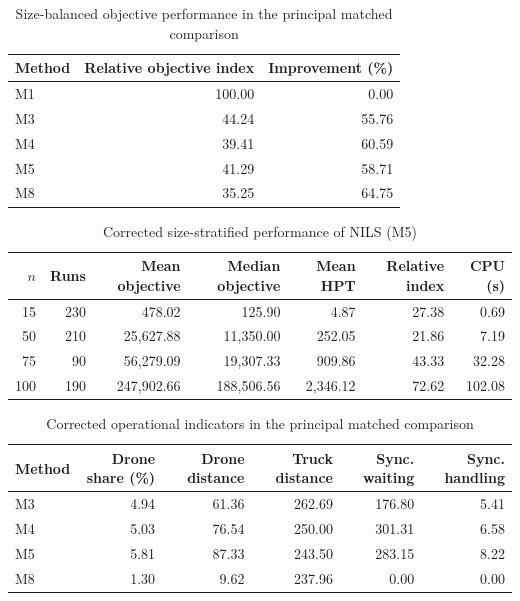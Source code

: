 
\begin{table}[htbp]
\centering
\caption{Size-balanced objective performance in the principal matched comparison}
\label{tab:size_balanced_corrected}
\small
\begin{tabular}{lrr}
\toprule
Method & Relative objective index & Improvement (\%) \\
\midrule
M1 & 100.00 & 0.00 \\
M3 & 44.24 & 55.76 \\
M4 & 39.41 & 60.59 \\
M5 & 41.29 & 58.71 \\
M8 & 35.25 & 64.75 \\
\bottomrule
\end{tabular}
\end{table}

\begin{table}[htbp]
\centering
\caption{Corrected size-stratified performance of NILS (M5)}
\label{tab:nils_size_corrected}
\small
\begin{tabular}{rrrrrrr}
\toprule
$n$ & Runs & Mean objective & Median objective & Mean HPT & Relative index & CPU (s) \\
\midrule
15 & 230 & 478.02 & 125.90 & 4.87 & 27.38 & 0.69 \\
50 & 210 & 25,627.88 & 11,350.00 & 252.05 & 21.86 & 7.19 \\
75 & 90 & 56,279.09 & 19,307.33 & 909.86 & 43.33 & 32.28 \\
100 & 190 & 247,902.66 & 188,506.56 & 2,346.12 & 72.62 & 102.08 \\
\bottomrule
\end{tabular}
\end{table}

\begin{table}[htbp]
\centering
\caption{Corrected operational indicators in the principal matched comparison}
\label{tab:operational_corrected}
\small
\begin{tabular}{lrrrrr}
\toprule
Method & Drone share (\%) & Drone distance & Truck distance & Sync. waiting & Sync. handling \\
\midrule
M3 & 4.94 & 61.36 & 262.69 & 176.80 & 5.41 \\
M4 & 5.03 & 76.54 & 250.00 & 301.31 & 6.58 \\
M5 & 5.81 & 87.33 & 243.50 & 283.15 & 8.22 \\
M8 & 1.30 & 9.62 & 237.96 & 0.00 & 0.00 \\
\bottomrule
\end{tabular}
\end{table}

